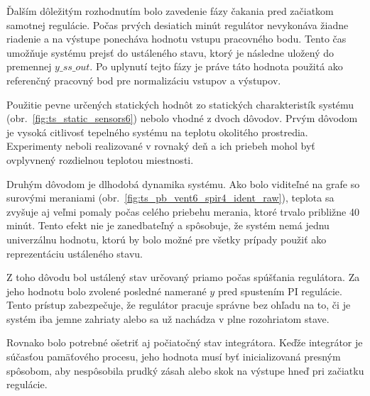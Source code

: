Ďalším dôležitým rozhodnutím bolo zavedenie fázy čakania pred začiatkom samotnej regulácie.  
Počas prvých desiatich minút regulátor nevykonáva žiadne riadenie a na výstupe ponecháva hodnotu vstupu pracovného bodu.  
Tento čas umožňuje systému prejsť do ustáleného stavu, ktorý je následne uložený do premennej $y\_{ss\_out}$.  
Po uplynutí tejto fázy je práve táto hodnota použitá ako referenčný pracovný bod pre normalizáciu vstupov a výstupov.

Použitie pevne určených statických hodnôt zo statických charakteristík systému (obr.~\ref{fig:ts_static_sensors6}) nebolo vhodné z dvoch dôvodov.  
Prvým dôvodom je vysoká citlivosť tepelného systému na teplotu okolitého prostredia.  
Experimenty neboli realizované v rovnaký deň a ich priebeh mohol byť ovplyvnený rozdielnou teplotou miestnosti.

Druhým dôvodom je dlhodobá dynamika systému.  
Ako bolo viditeľné na grafe so surovými meraniami (obr.~\ref{fig:ts_pb_vent6_spir4_ident_raw}), teplota sa zvyšuje aj veľmi pomaly počas celého priebehu merania, ktoré trvalo približne 40 minút.  
Tento efekt nie je zanedbateľný a spôsobuje, že systém nemá jednu univerzálnu hodnotu, ktorú by bolo možné pre všetky prípady použiť ako reprezentáciu ustáleného stavu.

Z toho dôvodu bol ustálený stav určovaný priamo počas spúšťania regulátora.  
Za jeho hodnotu bolo zvolené posledné namerané $y$ pred spustením PI regulácie.  
Tento prístup zabezpečuje, že regulátor pracuje správne bez ohľadu na to, či je systém iba jemne zahriaty alebo sa už nachádza v plne rozohriatom stave.

Rovnako bolo potrebné ošetriť aj počiatočný stav integrátora.  
Keďže integrátor je súčasťou pamäťového procesu, jeho hodnota musí byť inicializovaná presným spôsobom, aby nespôsobila prudký zásah alebo skok na výstupe hneď pri začiatku regulácie.

